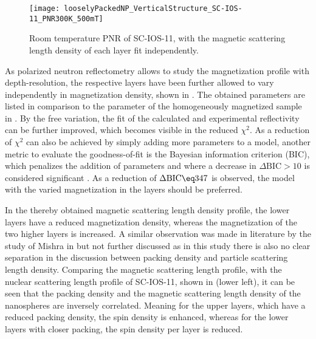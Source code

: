 \documentclass[\main/dresen_thesis.tex]{subfiles}
\begin{document}
  \begin{figure}[tb]
    \centering
    \texttt{[image: looselyPackedNP\_VerticalStructure\_SC-IOS-11\_PNR300K\_500mT]}
    \caption{\label{fig:looselyPackedNP:layer:pnrRoomTemperatureMagnetic}Room temperature PNR of SC-IOS-11, with the magnetic scattering length density of each layer fit independently.}
  \end{figure}
  As polarized neutron reflectometry allows to study the magnetization profile with depth-resolution, the respective layers have been further allowed to vary independently in magnetization density, shown in .
  The obtained parameters are listed in comparison to the parameter of the homogeneously magnetized sample in .
  By the free variation, the fit of the calculated and experimental reflectivity can be further improved, which becomes visible in the reduced $\chi^2$.
  As a reduction of $\chi^2$ can also be achieved by simply adding more parameters to a model, another metric to evaluate the goodness-of-fit is the Bayesian information criterion (BIC), which penalizes the addition of parameters and where a decrease in $\Delta \mathrm{BIC} > 10$ is considered significant \cite{Schwarz_1978_Estim, Kass_1995_Bayes}.
  As a reduction of $\Delta \mathrm{BIC} \eq 347$ is observed, the model with the varied magnetization in the layers should be preferred.

  In the thereby obtained magnetic scattering length density profile, the lower layers have a reduced magnetization density, whereas the magnetization of the two higher layers is increased.
  A similar observation was made in literature by the study of Mishra \etal in \cite{Mishra_2012_Selfa} but not further discussed as in this study there is also no clear separation in the discussion between packing density and particle scattering length density.
  Comparing the magnetic scattering length profile, with the nuclear scattering length profile of SC-IOS-11, shown in  (lower left), it can be seen that the packing density and the magnetic scattering length density of the nanospheres are inversely correlated.
  Meaning for the upper layers, which have a reduced packing density, the spin density is enhanced, whereas for the lower layers with closer packing, the spin density per layer is reduced.
\end{document}
